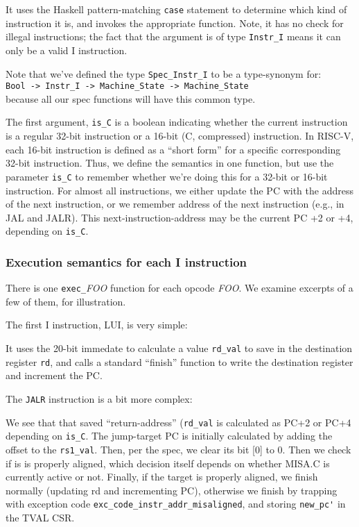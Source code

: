 \documentclass[11pt]{article}
\newcommand{\hm}{\hspace*{1em}}
\begin{document}


It uses the Haskell pattern-matching \verb|case| statement to
determine which kind of instruction it is, and invokes the appropriate
function.  Note, it has no check for illegal instructions; the fact
that the argument is of type \verb|Instr_I| means it can only be a
valid I instruction.

Note that we've defined the type \verb|Spec_Instr_I| to be a
type-synonym for: \\
\hm\verb|Bool -> Instr_I -> Machine_State -> Machine_State| \\
because all our spec functions will have this common type.

The first argument, \verb|is_C| is a boolean indicating whether the
current instruction is a regular 32-bit instruction or a 16-bit (C,
compressed) instruction.  In RISC-V, each 16-bit instruction is
defined as a ``short form'' for a specific corresponding 32-bit
instruction.  Thus, we define the semantics in one function, but use
the parameter \verb|is_C| to remember whether we're doing this for a
32-bit or 16-bit instruction.  For almost all instructions, we either
update the PC with the address of the next instruction, or we remember
address of the next instruction (e.g., in JAL and JALR). This
next-instruction-address may be the current PC +2 or +4, depending on
\verb|is_C|.


\subsubsection{Execution semantics for each I instruction}

There is one \verb|exec_|\emph{FOO} function for each opcode
\emph{FOO}.  We examine excerpts of a few of them, for illustration.

The first I instruction, LUI, is very simple:



It uses the 20-bit immedate to calculate a value \verb|rd_val| to save
in the destination register \verb|rd|, and calls a standard ``finish''
function to write the destination register and increment the PC.

The \verb|JALR| instruction is a bit more complex:



We see that that saved ``return-address'' (\verb|rd_val| is calculated
as PC+2 or PC+4 depending on \verb|is_C|.  The jump-target PC is
initially calculated by adding the offset to the \verb|rs1_val|.
Then, per the spec, we clear its bit [0] to 0.  Then we check if is is
properly aligned, which decision itself depends on whether MISA.C is
currently active or not.  Finally, if the target is properly aligned,
we finish normally (updating rd and incrementing PC), otherwise we
finish by trapping with exception code
\verb|exc_code_instr_addr_misaligned|, and storing \verb|new_pc'| in
the TVAL CSR.
\end{document}
